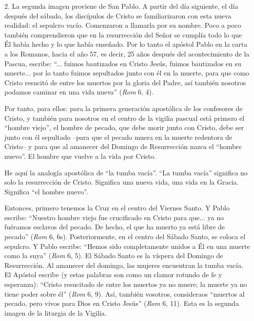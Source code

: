 			\begin{body}2. La segunda imagen proviene de San Pablo. A partir del día siguiente, el día después del sábado, los discípulos de Cristo se familiarizaron con esta nueva realidad: el sepulcro vacío. Comenzaron a llamarla por su nombre. Poco a poco también comprendieron que en la resurrección del Señor se cumplía todo lo que Él había hecho y lo que había enseñado. Por lo tanto el apóstol Pablo en la carta a los Romanos, hacia el año 57, es decir, 25 años después del acontecimiento de la Pascua, escribe: “... fuimos bautizados en Cristo Jesús, fuimos bautizados en su muerte... por lo tanto fuimos sepultados junto con él en la muerte, para que como Cristo resucitó de entre los muertos por la gloria del Padre, así también nosotros podamos caminar en una vida nueva” (\textit{Rom }6, 4). \end{body}
			
			\begin{body}Por tanto, para ellos: para la primera generación apostólica de los confesores de Cristo, y también para nosotros en el centro de la vigilia pascual está primero el “hombre viejo”, el hombre de pecado, que debe morir junto con Cristo, debe ser junto con él sepultado –para que el pecado muera en la muerte redentora de Cristo– y para que al amanecer del Domingo de Resurrección nazca el “hombre nuevo”. El hombre que vuelve a la vida por Cristo. \end{body}
			
			\begin{body}He aquí la analogía apostólica de “la tumba vacía”. “La tumba vacía” significa no solo la resurrección de Cristo. Significa una nueva vida, una vida en la Gracia. Significa “el hombre nuevo”. \end{body}
			
			\begin{body}Entonces, primero tenemos la Cruz en el centro del Viernes Santo. Y Pablo escribe: “Nuestro hombre viejo fue crucificado en Cristo para que... ya no fuéramos esclavos del pecado. De hecho, el que ha muerto ya está libre de pecado” (\textit{Rom }6, 6s). Posteriormente, en el centro del Sábado Santo, se coloca el sepulcro. Y Pablo escribe: “Hemos sido completamente unidos a Él en una muerte como la suya” (\textit{Rom }6, 5). El Sábado Santo es la víspera del Domingo de Resurrección. Al amanecer del domingo, las mujeres encuentran la tumba vacía. El Apóstol escribe (y estas palabras son como un clamor rotundo de fe y esperanza): “Cristo resucitado de entre los muertos ya no muere; la muerte ya no tiene poder sobre él” (\textit{Rom} 6, 9). Así, también vosotros, consideraos “muertos al pecado, pero vivos para Dios en Cristo Jesús” (\textit{Rom} 6, 11). Esta es la segunda imagen de la liturgia de la Vigilia. \end{body}
			
